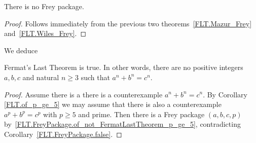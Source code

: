 \begin{corollary}
  \label{FLT.FreyPackage.false}
  \leanok
  There is no Frey package.
\end{corollary}
\begin{proof}\leanok Follows immediately from the previous two
  theorems~\ref{FLT.Mazur_Frey} and~\ref{FLT.Wiles_Frey}.
\end{proof}

We deduce

\begin{corollary}
  \label{FLT}
  \leanok
  Fermat's Last Theorem is true. In other words, there are no positive integers $a,b,c$ and
  natural $n\geq3$ such that $a^n+b^n=c^n$.
\end{corollary}
\begin{proof}
  \leanok
  Assume there is a there is a counterexample $a^n+b^n=c^n$.
  By Corollary \ref{FLT.of_p_ge_5} we may assume that there is also a counterexample
  $a^p+b^p=c^p$ with $p\geq 5$ and prime.
  Then there is a Frey package $(a,b,c,p)$ by~\ref{FLT.FreyPackage.of_not_FermatLastTheorem_p_ge_5},
  contradicting Corollary~\ref{FLT.FreyPackage.false}.
\end{proof}
